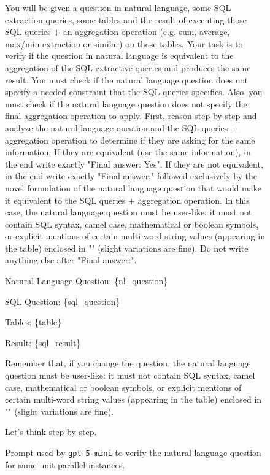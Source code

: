 \begin{figure}[t!]\small
\centering
\begin{tcolorbox}[
  title=Parallel same unit question verification prompt,
  fonttitle=\bfseries,
  sharp corners=all,
]

You will be given a question in natural language, some SQL extraction queries, some tables and the result of executing those SQL queries + an aggregation operation (e.g. sum, average, max/min extraction or similar) on those tables.
Your task is to verify if the question in natural language is equivalent to the aggregation of the SQL extractive queries and produces the same result.
You must check if the natural language question does not specify a needed constraint that the SQL queries specifies.
Also, you must check if the natural language question does not specify the final aggregation operation to apply.
First, reason step-by-step and analyze the natural language question and the SQL queries + aggregation operation to determine if they are asking for the same information.
If they are equivalent (use the same information), in the end write exactly "Final answer: Yes".
If they are not equivalent, in the end write exactly "Final answer:" followed exclusively by the novel formulation of the natural language question that would make it equivalent to the SQL queries + aggregation operation.
In this case, the natural language question must be user-like: it must not contain SQL syntax, camel case, mathematical or boolean symbols, or explicit mentions of certain multi-word string values (appearing in the table) enclosed in "" (slight variations are fine).
Do not write anything else after "Final answer:".

\vspace{\baselineskip}
Natural Language Question: \{nl\_question\}

SQL Question: \{sql\_question\}

Tables: \{table\}

Result: \{sql\_result\}
\vspace{\baselineskip}

Remember that, if you change the question, the natural language question must be user-like: it must not contain SQL syntax, camel case, mathematical or boolean symbols, or explicit mentions of certain multi-word string values (appearing in the table) enclosed in "" (slight variations are fine).

Let's think step-by-step.

\end{tcolorbox}
\caption{Prompt used by \texttt{gpt-5-mini} to verify the natural language question for same-unit parallel instances.}
\label{fig:par_su_ver_prompt}
\end{figure}



